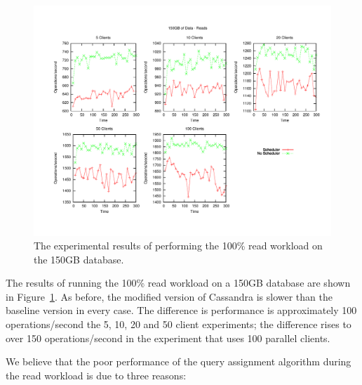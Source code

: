 \begin{figure}[t]
\centering
\includegraphics[scale=0.563]{images/150GB_Reads.pdf}
\vspace{-15pt}
\caption{The experimental results of performing the 100\% read workload on the 150GB database.}
\label{fig:150g_reads}
\end{figure}

The results of running the 100\% read workload on a 150GB database are shown in Figure~\ref{fig:150g_reads}. As before, the modified version of Cassandra is slower than the baseline version in every case. The difference is performance is approximately 100 operations/second the 5, 10, 20 and 50 client experiments; the difference rises to over 150 operations/second in the experiment that uses 100 parallel clients.

We believe that the poor performance of the query assignment algorithm during the read workload is due to three reasons:


